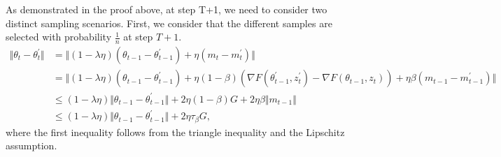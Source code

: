 As demonstrated in the proof above, at step T+1, we need to consider two distinct sampling scenarios. First, we consider that the different samples are selected with probability $\frac{1}{n}$ at step $T+1$.  
\begin{equation}
  \begin{aligned}
   \Vert \theta_t -\theta_t^{\prime} \Vert &= \Vert (1-\lambda \eta) (\theta_{t-1} - \theta_{t-1}^{\prime}) + \eta (m_t - m_t^{\prime})\Vert\\
   &= \Vert (1-\lambda \eta) (\theta_{t-1} - \theta_{t-1}^{\prime}) + \eta (1-\beta)(\nabla F(\theta_{t-1}^{\prime},z_{t}^{\prime}) - \nabla F(\theta_{t-1},z_{t})) + \eta \beta(m_{t-1} - m_{t-1}^{\prime})\Vert\\
    &\leq (1-\lambda \eta)\Vert\theta_{t-1} - \theta_{t-1}^{\prime}\Vert + 2\eta(1-\beta)G + 2\eta \beta\Vert m_{t-1}\Vert \\
    &\leq (1-\lambda \eta)\Vert\theta_{t-1} - \theta_{t-1}^{\prime}\Vert + 2\eta \tau_\beta G,
  \end{aligned}
 \end{equation}
where the first inequality follows from the triangle inequality and the Lipschitz assumption.



